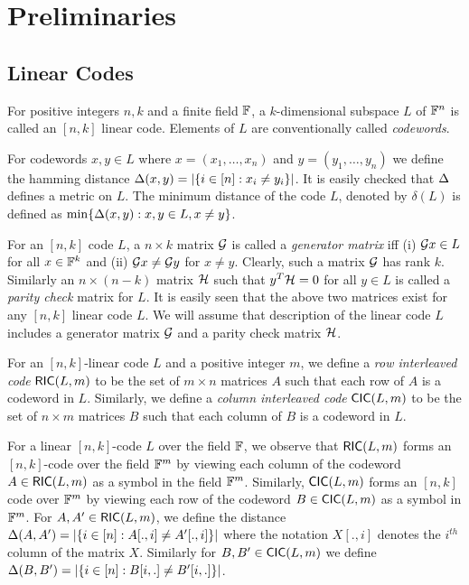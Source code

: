 \section{Preliminaries}\label{sec:prelim}
\subsection{Linear Codes}
\begin{definition}\label{defn:lincode}
For positive integers $n,k$ and a finite field $\mathbb{F}$, a $k$-dimensional
subspace $L$ of $\mathbb{F}^n$ is called an $[n,k]$ linear code. Elements of $L$ are
conventionally called {\em codewords}. 
\end{definition}

For codewords $x,y\in L$ where $x=(x_1,\ldots,x_n)$ and $y=(y_1,\ldots,y_n)$ we
define the hamming distance $\Delta(x,y)=|\{i\in [n]: x_i\neq y_i\}|$. It is
easily checked that $\Delta$ defines a metric on $L$. The minimum distance of
the code $L$, denoted by $\delta(L)$ is defined as $\min\{\Delta(x,y):x,y\in L,
x\neq y\}$.

For an $[n,k]$ code $L$, a $n\times k$ matrix $\mathcal{G}$ is called a {\em generator
matrix} iff (i) $\mathcal{G} x\in L$ for all $x\in\mathbb{F}^k$ and (ii) $\mathcal{G} x\neq
\mathcal{G} y$ for $x\neq
y$. Clearly, such a matrix $\mathcal{G}$ has rank $k$. Similarly an $n\times (n-k)$
matrix $\mathcal{H}$ such that $y^T\mathcal{H}=0$ for all $y\in L$ is called a {\em parity check}
matrix for $L$. It is easily seen that the above two matrices exist for any
$[n,k]$ linear code $L$. We will assume that description of the linear code $L$
includes a generator matrix $\mathcal{G}$ and a parity check matrix $\mathcal{H}$.

\begin{definition}\label{defn:interleavedcode}
For an $[n,k]$-linear code $L$ and a positive integer $m$, we define a {\em row
interleaved code} $\mathsf{RIC}(L,m)$ to be the set of $m\times n$ matrices $A$ such that
each row of $A$ is a codeword in $L$. Similarly, we define a {\em column
interleaved code} $\mathsf{CIC}(L,m)$ to be the set of $n\times m$ matrices $B$ such
that each column of $B$ is a codeword in $L$.
\end{definition}

For a linear $[n,k]$-code $L$ over the field $\mathbb{F}$, we observe that
$\mathsf{RIC}(L,m)$ forms an $[n,k]$-code over the field $\mathbb{F}^m$ by viewing each
column of the codeword $A\in \mathsf{RIC}(L,m)$ as a symbol in the field $\mathbb{F}^m$.
Similarly, $\mathsf{CIC}(L,m)$ forms an $[n,k]$ code over $\mathbb{F}^m$ by viewing each row
of the codeword $B\in \mathsf{CIC}(L,m)$ as a symbol in $\mathbb{F}^m$. For $A,A'\in
\mathsf{RIC}(L,m)$, we define the distance $\Delta(A,A')=|\{i\in [n]: A[.,i]\neq
A'[.,i]\}|$ where the notation $X[.,i]$ denotes the $i^{th}$ column of the
matrix $X$. Similarly for $B,B'\in \mathsf{CIC}(L,m)$ we define $\Delta(B,B')=|\{i\in
[n]: B[i,.]\neq B'[i,.]\}|$.
 
